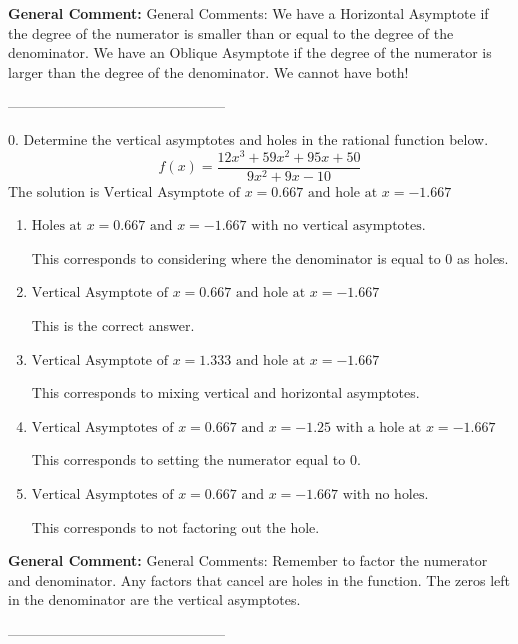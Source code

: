 \documentclass{extbook}[14pt]
\begin{document}
\textbf{General Comment:} General Comments: We have a Horizontal Asymptote if the degree of the numerator is smaller than or equal to the degree of the denominator. We have an Oblique Asymptote if the degree of the numerator is larger than the degree of the denominator. We cannot have both! 

-----------------------------------------------

0. Determine the vertical asymptotes and holes in the rational function below.
\[ f(x) = \frac{12x^{3} +59 x^{2} +95 x + 50}{9x^{2} +9 x -10} \] 
The solution is $ \text{Vertical Asymptote of } x = 0.667 \text{ and hole at } x = -1.667 $ 

\begin{enumerate}[label=\Alph*.] 
\item $ \text{Holes at } x = 0.667 \text{ and } x = -1.667 \text{ with no vertical asymptotes.} $ 

 This corresponds to considering where the denominator is equal to 0 as holes. 
\item $ \text{Vertical Asymptote of } x = 0.667 \text{ and hole at } x = -1.667 $ 

 This is the correct answer. 
\item $ \text{Vertical Asymptote of } x = 1.333 \text{ and hole at } x = -1.667 $ 

 This corresponds to mixing vertical and horizontal asymptotes. 
\item $ \text{Vertical Asymptotes of } x = 0.667 \text{ and } x = -1.25 \text{ with a hole at } x = -1.667 $ 

 This corresponds to setting the numerator equal to 0. 
\item $ \text{Vertical Asymptotes of } x = 0.667 \text{ and } x = -1.667 \text{ with no holes.} $ 

 This corresponds to not factoring out the hole. 
\end{enumerate} 
 
\textbf{General Comment:} General Comments: Remember to factor the numerator and denominator. Any factors that cancel are holes in the function. The zeros left in the denominator are the vertical asymptotes. 

-----------------------------------------------
\end{document}
